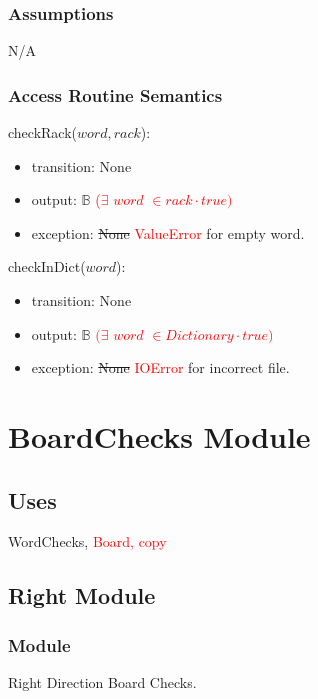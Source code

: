 \documentclass[12pt]{article}
\begin{document}
\subsubsection* {Assumptions}

N/A

\subsubsection* {Access Routine Semantics}

\noindent checkRack($word, rack$):
\begin{itemize}
\item transition: None
\item output: \sout{$\mathbb{B}$} \textcolor{red}{($\exists$   $word$ $\in rack \cdot true)$}
\item exception: \sout{None} \textcolor{red}{ValueError} for empty word.
\end{itemize}

\noindent checkInDict($word$):
\begin{itemize}
\item transition: None
\item output: \sout{$\mathbb{B}$} \textcolor{red}{$(\exists$   $word$ $\in Dictionary \cdot true)$}
\item exception: \sout{None} \textcolor{red}{IOError} for incorrect file.
\end{itemize}

\newpage

\section* {BoardChecks Module}

\subsection* {Uses}

WordChecks, \textcolor{red}{Board, copy}

\subsection*{Right Module}

\subsubsection*{Module}

Right Direction Board Checks.
\end{document}
